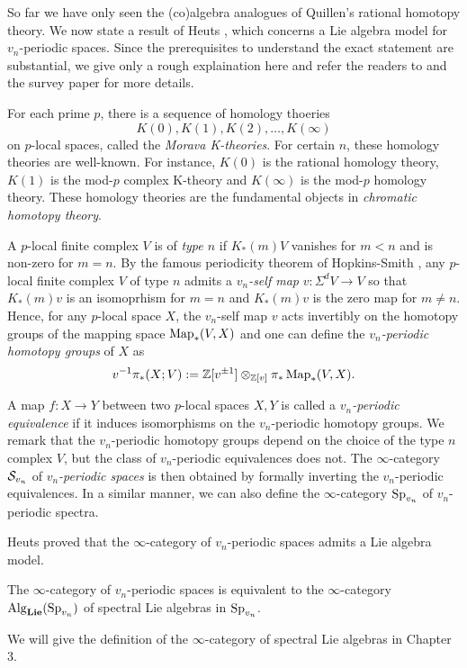 So far we have only seen the (co)algebra analogues of Quillen's rational homotopy theory.
We now state a result of Heuts \cite{heuts2018lie}, which concerns a Lie algebra model for $v_n$-periodic spaces.
Since the prerequisites to understand the exact statement are substantial, we give only a rough explaination here and refer the readers to \cite{heuts2018lie} and the survey paper \cite{HeutsSurvey} for more details.

For each prime $p$, there is a sequence of homology thoeries $$K(0), K(1), K(2), \dots, K(\infty)$$ 
on $p$-local spaces, called the \emph{Morava K-theories}. 
For certain $n$, these homology theories are well-known. For instance, $K(0)$ is the rational homology theory, $K(1)$ is the mod-$p$ complex K-theory and $K(\infty)$ is the mod-$p$ homology theory.
These homology theories are the fundamental objects in \emph{chromatic homotopy theory}.

A $p$-local finite complex $V$ is of \emph{type $n$} if $K_*(m)V$ vanishes for $m<n$ and is non-zero for $m=n$.
By the famous periodicity theorem of Hopkins-Smith \cite{Hopkins-Smith}, any $p$-local finite complex $V$ of type $n$ admits a \emph{$v_n$-self map} $v:\Sigma^d V\to V$ so that $K_*(m)v$ is an isomoprhism for $m=n$ and $K_*(m)v$ is the zero map for $m\neq n$.
Hence, for any $p$-local space $X$, the $v_n$-self map $v$ acts invertibly on the homotopy groups of the mapping space $\operatorname{Map}_*(V,X)$ and one can define the \emph{$v_n$-periodic homotopy groups} of $X$ as
$$
v^{-1}\pi_*(X;V):= {\mathbb{Z}}[v^{\pm 1}]\otimes_{{\mathbb{Z}}[v] }\pi_* \operatorname{Map}_*(V,X).
$$

A map $f:X \to Y$ between two $p$-local spaces $X,Y$ is called a \emph{$v_n$-periodic equivalence} if it induces isomorphisms on the $v_n$-periodic homotopy groups.
We remark that the $v_n$-periodic homotopy groups depend on the choice of the type $n$ complex $V$, but the class of $v_n$-periodic equivalences does not.
The $\infty$-category ${\mathcal{S}}_{v_n}$ of \emph{$v_n$-periodic spaces} is then obtained by formally inverting the $v_n$-periodic equivalences.
In a similar manner, we can also define the $\infty$-category $\operatorname{Sp}_{v_n}$ of $v_n$-periodic spectra.

Heuts proved that the $\infty$-category of $v_n$-periodic spaces admits a Lie algebra model.
\begin{theorem}
\cite{heuts2018lie}
The $\infty$-category of $v_n$-periodic spaces is equivalent to the $\infty$-category $\operatorname{Alg}_{\mathbf{Lie}}(\operatorname{Sp}_{v_n})$ of spectral Lie algebras in $\operatorname{Sp}_{v_n}$.
\end{theorem}
We will give the definition of the $\infty$-category of spectral Lie algebras in Chapter 3.

